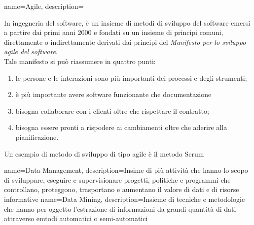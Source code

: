 
\renewcommand{\acronymname}{Acronimi e abbreviazioni}

{
	name=Agile,
	description={
		 In ingegneria del software, è un insieme di metodi di sviluppo del software emersi a partire dai primi anni 2000 e fondati su un insieme di principi comuni, direttamente o indirettamente derivati dai principi del \textit{Manifesto per lo sviluppo agile del software}\cite{manifestoAgile}.\\
		 Tale manifesto si può riassumere in quattro punti:
		 \begin{enumerate}
		 	\item le persone e le interazioni sono più importanti dei processi e degli strumenti;
		 	\item è più importante avere software funzionante che documentazione
		 	\item bisogna collaborare con i clienti oltre che rispettare il contratto;
		 	\item bisogna essere pronti a rispodere ai cambiamenti oltre che aderire alla pianificazione.
		 \end{enumerate}
		 Un esempio di metodo di sviluppo di tipo agile è il metodo \gls{Scrum}}
}
{
	name=Data Management,
	description={Insime di più attività che hanno lo scopo di sviluppare, eseguire e supervisionare progetti, politiche e programmi che controllano, proteggono, trasportano e aumentano il valore di dati e di risorse informative}
}
{
  name=Data Mining,
  description={Insieme di tecniche e metodologie che hanno per oggetto l'estrazione di informazioni da grandi quantità di dati attraverso
  emtodi automatici o semi-automatici}
}
